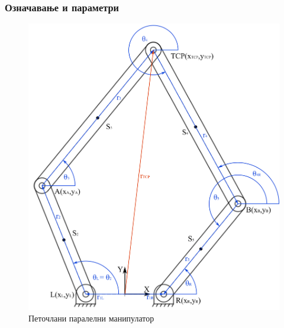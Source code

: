 \documentclass[12pt]{article}
\begin{document}
\subsubsection{Означавање и параметри}
\begin{figure}[H]
    \centering
    \includegraphics[width=13cm]{figures/5bar.jpg}
    \caption{Петочлани паралелни манипулатор}
    \label{fig:5bar_manipulator}
\end{figure}
\end{document}
